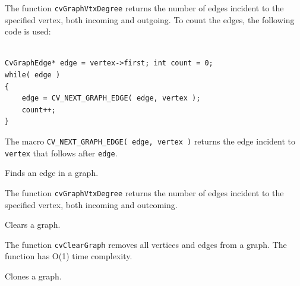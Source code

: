 The function \texttt{cvGraphVtxDegree} returns the number of edges incident to the specified vertex, both incoming and outgoing. To count the edges, the following code is used:

\begin{lstlisting}

CvGraphEdge* edge = vertex->first; int count = 0;
while( edge )
{
    edge = CV_NEXT_GRAPH_EDGE( edge, vertex );
    count++;
}

\end{lstlisting}

The macro \texttt{CV\_NEXT\_GRAPH\_EDGE( edge, vertex )} returns the edge incident to \texttt{vertex} that follows after \texttt{edge}.

\label{GraphVtxDegreeByPtr}

Finds an edge in a graph.


\begin{description}
\end{description}

The function \texttt{cvGraphVtxDegree} returns the number of edges incident to the specified vertex, both incoming and outcoming.


\label{ClearGraph}

Clears a graph.


\begin{description}
\end{description}

The function \texttt{cvClearGraph} removes all vertices and edges from a graph. The function has O(1) time complexity.

\label{CloneGraph}

Clones a graph.


